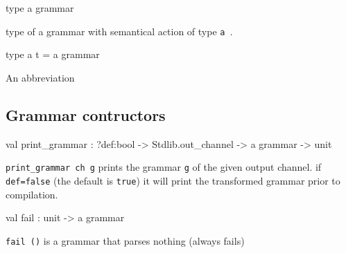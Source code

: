 \documentclass[11pt]{article}
\begin{document}
\label{type:Grammar.grammar}\begin{ocamldoccode}
type {\textquotesingle}a grammar 
\end{ocamldoccode}
\begin{ocamldocdescription}
type of a grammar with semantical action of type {\tt{{\textquotesingle}a }}.


\end{ocamldocdescription}




\label{type:Grammar.t}\begin{ocamldoccode}
type {\textquotesingle}a t = {\textquotesingle}a grammar 
\end{ocamldoccode}
\begin{ocamldocdescription}
An abbreviation


\end{ocamldocdescription}




\subsection{Grammar contructors}




\label{val:Grammar.print-underscoregrammar}\begin{ocamldoccode}
val print_grammar : ?def:bool -> Stdlib.out_channel -> {\textquotesingle}a grammar -> unit
\end{ocamldoccode}
\begin{ocamldocdescription}
{\tt{print\_grammar ch g}} prints the grammar {\tt{g}} of the given output channel.
    if {\tt{def=false}} (the default is {\tt{true}}) it will print the transformed
    grammar prior to compilation.


\end{ocamldocdescription}




\label{val:Grammar.fail}\begin{ocamldoccode}
val fail : unit -> {\textquotesingle}a grammar
\end{ocamldoccode}
\begin{ocamldocdescription}
{\tt{fail ()}} is a grammar that parses nothing (always fails)


\end{ocamldocdescription}
\end{document}
